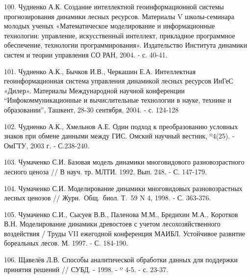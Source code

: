\documentclass{article}
\begin{document}
100. Чудненко А.К. Создание интеллектной геоинформационной 
системы прогнозирования динамики лесных ресурсов. 
Материалы V школы-семинара молодых ученых «Математическое 
моделирование и информационные технологии: 
управление, искусственный интеллект, прикладное 
программное обеспечение, технологии программирования». 
Издательство Института динамики систем и теории 
управления СО РАН, 2004. - с. 40-41.

101. Чудненко А.К., Бычков И.В., Черкашин Е.А. Интеллектная 
геоинформационная система управления динамикой 
лесных ресурсов ИнГеС «Дилер». Материалы Международной 
научной конференции ``Инфокоммуникационные 
и вычислительные технологии в науке, технике 
и образовании'', Ташкент, 28-30 сентября, 2004. - с. 
124-128

102. Чудненко А.К., Хмельнов А.Е. Один подход к 
преобразованию условных знаков при обмене 
данными между ГИС. Омский научный вестник, º4(25). 
- ОмГТУ, 2003 г. - С.238-240.

103. Чумаченко С.И. Базовая модель динамики многовидового 
разновозрастного лесного ценоза // В науч. тр. 
МЛТИ. 1992. Вып. 248. - С. 147-179.

104. Чумаченко С.И. Моделирование динамики многовидовых 
разновозрастных лесных ценозов // Журн.~Общ.~биол. 
Т.~59 N 4, 1998. - С. 363-376.

105. Чумаченко С.И., Сысуев В.В., Паленова М.М., Бредихин 
М.А., Коротков В.Н. Моделирование динамики древостоев 
с учетом лесохозяйственного воздействия / Труды 
VII ежегодной конференция МАИБЛ. Устойчивое 
развитие бореальных лесов. М. 1997. - С. 184-190.

106. Щавелёв Л.В. Способы аналитической обработки 
данных для поддержки принятия решений // \label{OLEHLINK24}\label{OLEHLINK25}СУБД. 
- 1998. - º 4-5. - с. 23-37.

\newpage
\end{document}
